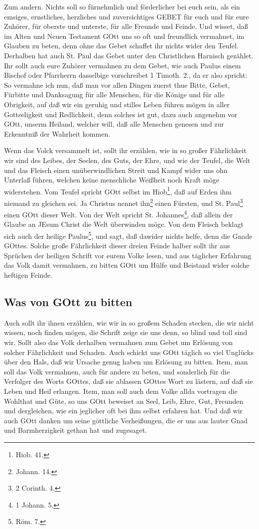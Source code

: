 Zum andern. Nichts soll so fürnehmlich und förderlicher bei euch sein, als ein emsiges, ernstliches, herzliches und zuversichtiges GEBET für euch und für eure Zuhörer, für oberste und unterste, für alle Freunde und Feinde. Und wisset, daß im Alten und Neuen Testament GOtt uns so oft und freundlich vermahnet, im Glauben zu beten, denn ohne das Gebet schaffet ihr nichts wider den Teufel. Derhalben hat auch St. Paul das Gebet unter den Christlichen Harnisch gezählet. Ihr sollt auch eure Zuhörer vermahnen zu dem Gebet, wie auch Paulus einem Bischof oder Pfarrherrn dasselbige vorschreibet 1 Timoth. 2., da er also spricht: So vermahne ich nun, daß man vor allen Dingen zuerst thue Bitte, Gebet, Fürbitte und Danksagung für alle Menschen, für die Könige und für alle Obrigkeit, auf daß wir ein geruhig und stilles Leben führen mögen in aller Gottseligkeit und Redlichkeit, denn solches ist gut, dazu auch angenehm vor GOtt, unserm Heiland, welcher will, daß alle Menschen genesen und zur Erkenntniß der Wahrheit kommen.

Wenn das Volck versammelt ist, sollt ihr erzählen, wie in so großer Fährlichkeit wir sind des Leibes, der Seelen, des Guts, der Ehre, und wie der Teufel, die Welt und das Fleisch einen unüberwindlichen Streit und Kampf wider uns ohn Unterlaß führen, welchen keine menschliche Weißheit noch Kraft möge widerstehen. Vom Teufel spricht GOtt selbst im Hiob\footnote{Hiob. 41.}, daß auf Erden ihm niemand zu gleichen sei. Ja Christus nennet ihn\footnote{Johann. 14.} einen Fürsten, und St. Paul\footnote{2 Corinth. 4.} einen GOtt dieser Welt. Von der Welt spricht St. Johannes\footnote{1 Johann. 5.}, daß allein der Glaube an JEsum Christ die Welt überwinden möge. Von dem Fleisch beklagt sich auch der heilige Paulus\footnote{Röm. 7.}, und sagt, daß dawider nichts helfe,
denn die Gnade GOttes. Solche große Fährlichkeit dieser dreien Feinde halber sollt ihr aus Sprüchen der heiligen Schrift vor eurem Volke lesen, und aus täglicher Erfahrung das Volk damit vermahnen, zu bitten GOtt um Hülfe und Beistand wider solche heftigen Feinde.

\subsection{Was von GOtt zu bitten}

Auch sollt ihr ihnen erzählen, wie wir in so großem Schaden stecken, die wir nicht wissen, noch finden mögen, die Schrift zeige sie uns denn, so blind und toll sind wir. Sollt also das Volk derhalben vermahnen zum Gebet um Erlösung von solcher Fährlichkeit und Schaden. Auch schickt uns GOtt täglich so viel Unglücks über den Hals, daß wir Ursache genug haben um Erlösung zu bitten. Item, man soll das Volk vermahnen, auch für andere zu beten, und sonderlich für die Verfolger des Worts GOttes, daß sie ablassen GOttes Wort zu lästern, auf daß sie Leben und Heil erlangen. Item, man soll auch dem Volke allda vortragen die Wohlthat und Güte, so uns GOtt beweiset an Seel, Leib, Ehre, Gut, Freunden und dergleichen, wie ein jeglicher oft bei ihm selbst erfahren hat. Und daß wir auch GOtt danken um seine göttliche Verheißungen, die er uns aus lauter Gnad und Barmherzigkeit gethan hat und zugesaget.

